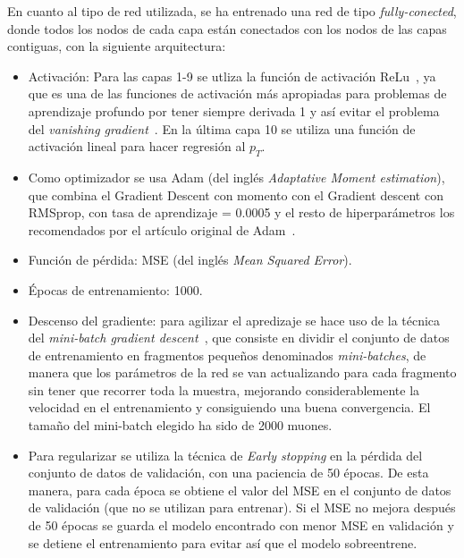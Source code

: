 En cuanto al tipo de red utilizada, se ha entrenado una red de tipo \textit{fully-conected}, donde todos los nodos de cada capa est\'an conectados con los nodos de las capas contiguas, con la siguiente arquitectura:


\begin{itemize}

\item Activaci\'on: Para las capas 1-9 se utliza la funci\'on de activaci\'on ReLu~\cite{agarap2018deep}, ya que es una de las funciones de activaci\'on m\'as apropiadas para problemas de aprendizaje profundo por tener siempre derivada 1 y as\'i evitar el problema del \textit{vanishing gradient}~\cite{Hochreiter:91}. En la \'ultima capa 10 se utiliza una funci\'on de activaci\'on lineal para hacer regresi\'on al $p_{T}$.

\item Como optimizador se usa Adam (del ingl\'es \textit{Adaptative Moment estimation}), que combina el Gradient Descent con momento con el Gradient descent con RMSprop, con tasa de aprendizaje = 0.0005 y el resto de hiperpar\'ametros los recomendados por el art\'iculo original de Adam~\cite{Kingma2015AdamAM}.

\item Funci\'on de p\'erdida: MSE (del ingl\'es \textit{Mean Squared Error}).

\item \'Epocas de entrenamiento: 1000.

\item Descenso del gradiente: para agilizar el apredizaje se hace uso de la t\'ecnica del \textit{mini-batch gradient descent}~\cite{perrone2019optimal}, que consiste en dividir el conjunto de datos de entrenamiento en fragmentos peque\~nos denominados \textit{mini-batches}, de manera que los par\'ametros de la red se van actualizando para cada fragmento sin tener que recorrer toda la muestra, mejorando considerablemente la velocidad en el entrenamiento y consiguiendo una buena convergencia. El tama\~no del mini-batch elegido ha sido de 2000 muones.

\item Para regularizar se utiliza la t\'ecnica de \textit{Early stopping} en la p\'erdida del conjunto de datos de validaci\'on, con una paciencia de 50 \'epocas. De esta manera, para cada \'epoca se obtiene el valor del MSE en el conjunto de datos de validaci\'on (que no se utilizan para entrenar). Si el MSE no mejora despu\'es de 50 \'epocas se guarda el modelo encontrado con menor MSE en validaci\'on y se detiene el entrenamiento para evitar as\'i que el modelo sobreentrene. 

\end{itemize}

